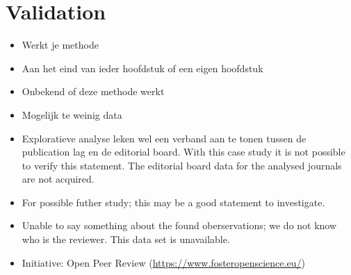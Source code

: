 \documentclass{ou-report}
\newcommand{\outline}[1]{{\color{blue} #1}}
\begin{document}
\section{Validation}
\outline{
\begin{itemize}
    \item Werkt je methode
    \item Aan het eind van ieder hoofdstuk of een eigen hoofdstuk
\end{itemize}
}
\begin{itemize}
    \item Onbekend of deze methode werkt
    \item Mogelijk te weinig data
    \item Exploratieve analyse leken wel een verband aan te tonen tussen de
    publication lag en de editorial board. With this case study it is not 
    possible to verify this statement. The editorial board data for the analysed
    journals are not acquired. 
    \item For possible futher study; this may be a good statement to 
    investigate.
    \item Unable to say something about the found oberservations; we do not know
    who is the reviewer. This data set is unavailable.
    \item Initiative: Open Peer Review (\url{https://www.fosteropenscience.eu/})
\end{itemize}




\end{document}

